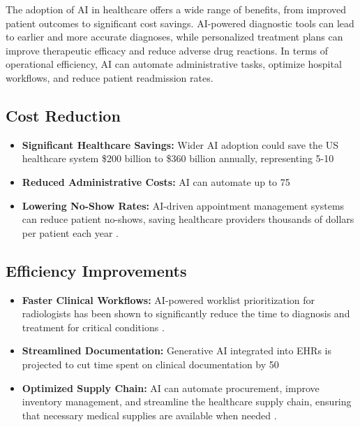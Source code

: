 The adoption of AI in healthcare offers a wide range of benefits, from improved patient outcomes to significant cost savings. AI-powered diagnostic tools can lead to earlier and more accurate diagnoses, while personalized treatment plans can improve therapeutic efficacy and reduce adverse drug reactions. In terms of operational efficiency, AI can automate administrative tasks, optimize hospital workflows, and reduce patient readmission rates.

\subsection{Cost Reduction}
\begin{itemize}
    \item \textbf{Significant Healthcare Savings:} Wider AI adoption could save the US healthcare system \$200 billion to \$360 billion annually, representing 5-10%
    \item \textbf{Reduced Administrative Costs:} AI can automate up to 75%
    \item \textbf{Lowering No-Show Rates:} AI-driven appointment management systems can reduce patient no-shows, saving healthcare providers thousands of dollars per patient each year \cite{TechMagic_AIBenefits}.
\end{itemize}

\subsection{Efficiency Improvements}
\begin{itemize}
    \item \textbf{Faster Clinical Workflows:} AI-powered worklist prioritization for radiologists has been shown to significantly reduce the time to diagnosis and treatment for critical conditions \cite{Aidoc_AIBenefits}.
    \item \textbf{Streamlined Documentation:} Generative AI integrated into EHRs is projected to cut time spent on clinical documentation by 50%
    \item \textbf{Optimized Supply Chain:} AI can automate procurement, improve inventory management, and streamline the healthcare supply chain, ensuring that necessary medical supplies are available when needed \cite{Kyndryl_AIBenefits}.
\end{itemize}

